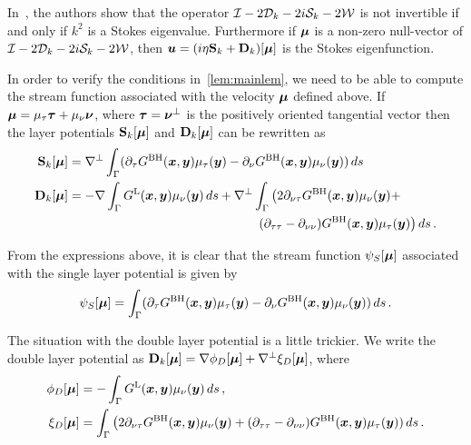 In~\cite{askhameig2019}, the authors show that the operator 
$\mathcal I -2{\mathcal D}_{k} -2i {\mathcal S}_{k} -2{\mathcal W}$ is not invertible if and only
if $k^2$ is a Stokes eigenvalue.
Furthermore if ${\boldsymbol \mu}$ is a non-zero null-vector of $\mathcal I - 2{\mathcal D}_{k} -2i {\mathcal S}_{k} 
-2 {\mathcal W}$, then 
${\boldsymbol u} = (i \eta {\bf S}_{k} + {\bf D}_{k})[{\boldsymbol \mu}]$ is the Stokes eigenfunction.

In order to verify the conditions in~\cref{lem:mainlem}, we
need to be able to compute the stream function associated with
the velocity ${\boldsymbol \mu}$ defined above.
If ${\boldsymbol \mu} = \mu_{\tau} {\boldsymbol \tau} + \mu_{\nu} {\boldsymbol \nu}$, where ${\boldsymbol \tau}={\boldsymbol \nu}^{\perp}$
is the positively oriented tangential vector then the
layer potentials ${\bf S}_{k}[{\boldsymbol \mu}]$ and ${\bf D}_{k}[{\boldsymbol \mu}]$ can be rewritten as
\begin{align}
\bS_{k}[\bmu] &=  
\nabla^{\perp} 
\int_{\Gamma} (\partial_{\tau} \Gbh(\xx,\yy) \mu_{\tau}(\yy) -
\partial_{\nu} \Gbh(\xx,\yy) \mu_{\nu}(\yy)) \, ds \\
\bD_{k}[\bmu] &= 
-\nabla 
\int_{\Gamma} \Glap(\xx,\yy) \mu_{\nu}(\yy) \, ds 
+ \nabla^{\perp} 
\int_{\Gamma} \big( 2 \partial_{\nu\tau} \Gbh(\xx,\yy) \mu_{\nu}(\yy) 
+ \\
& \hspace*{35ex}(\partial_{\tau\tau} -\partial_{\nu\nu})\Gbh(\xx,\yy) \mu_{\tau}(\yy) 
\big) \, ds \, .
\end{align}

From the expressions above, it is clear that the stream function 
$\psi_{S}[{\boldsymbol \mu}]$ associated with the single layer potential is given
by
\begin{equation}
\psi_{S}[{\boldsymbol \mu}] = 
\int_{\Gamma} (\partial_{\tau} G^{\textrm{BH}}({\boldsymbol x},{\boldsymbol y}) \mu_{\tau}({\boldsymbol y}) -
\partial_{\nu} G^{\textrm{BH}}({\boldsymbol x},{\boldsymbol y}) \mu_{\nu}({\boldsymbol y})) \, ds \, . 
\end{equation}

The situation with the double layer potential is a little trickier. 
We write the double layer potential as ${\bf D}_{k}[{\boldsymbol \mu}] = \nabla \phi_{D}[{\boldsymbol \mu}]
+ \nabla^{\perp} \xi_{D}[{\boldsymbol \mu}]$, 
where 
\begin{align}
\label{eq:phiddef}
\phi_{D}[{\boldsymbol \mu}] &= 
-\int_{\Gamma} G^{\textrm{L}}({\boldsymbol x},{\boldsymbol y}) \mu_{\nu}({\boldsymbol y}) \, ds  \, , \\
\xi_{D}[{\boldsymbol \mu}] &= 
\int_{\Gamma} \big( 2 \partial_{\nu\tau} G^{\textrm{BH}}({\boldsymbol x},{\boldsymbol y}) \mu_{\nu}({\boldsymbol y}) 
+ (\partial_{\tau\tau} -\partial_{\nu\nu})G^{\textrm{BH}}({\boldsymbol x},{\boldsymbol y}) \mu_{\tau}({\boldsymbol y}) ) \,
ds \, . 
\end{align}

